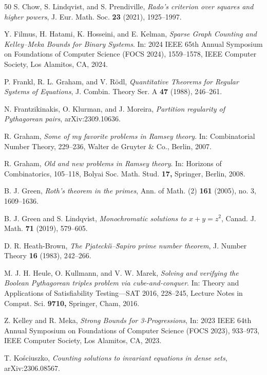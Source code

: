 \documentclass[12pt, reqno]{amsart}
\theoremstyle{definition}
\theoremstyle{remark}
\numberwithin{equation}{section}
\theoremstyle{definition}
\begin{document}
\begin{thebibliography}{50}
S. Chow, S. Lindqvist, and S. Prendiville, \emph{Rado's criterion over squares and higher powers}, J. Eur. Math. Soc. \textbf{23} (2021), 1925--1997.

Y. Filmus, H. Hatami, K. Hosseini, and E. Kelman, \emph{Sparse Graph Counting and Kelley--Meka Bounds for Binary Systems}. In: 2024 IEEE 65th Annual Symposium on Foundations of Computer Science (FOCS 2024), 1559--1578, IEEE Computer Society, Los Alamitos, CA, 2024.

P. Frankl, R. L. Graham, and V. R\"odl, \emph{Quantitative Theorems for Regular
Systems of Equations},
J. Combin. Theory Ser. A \textbf{47} (1988), 246--261.

N. Frantzikinakis, O. Klurman, and J. Moreira, \emph{Partition regularity of Pythagorean pairs}, 	arXiv:2309.10636.

R. Graham, \emph{Some of my favorite problems in Ramsey theory}. In: Combinatorial Number Theory, 229--236, Walter de Gruyter \& Co., Berlin, 2007.

R. Graham, \emph{Old and new problems in Ramsey theory}. In: Horizons of Combinatorics, 105--118, Bolyai Soc. Math. Stud. \textbf{17,} Springer, Berlin, 2008.

B. J. Green, \emph{Roth's theorem in the primes}, Ann. of Math. (2) \textbf{161} (2005), no. 3, 1609--1636.

B. J. Green and S. Lindqvist, \emph{Monochromatic solutions to $x + y = z^2$}, Canad. J. Math. \textbf{71} (2019), 579--605.

D. R. Heath-Brown, \emph{The Pjatecki\u{\i}--\u{S}apiro prime number theorem}, J. Number Theory \textbf{16} (1983), 242--266.

M. J. H. Heule, O. Kullmann, and V. W. Marek, \emph{Solving and verifying the Boolean Pythagorean
triples problem via cube-and-conquer}. In: Theory and Applications of Satisfiability
Testing---SAT 2016, 228--245, Lecture Notes in Comput. Sci. \textbf{9710,}
Springer, Cham, 2016.

Z. Kelley and R. Meka, \emph{Strong Bounds for 3-Progressions}, In: 2023 IEEE 64th Annual Symposium on Foundations of Computer Science (FOCS 2023), 933--973, IEEE Computer Society, Los Alamitos, CA, 2023. %

T. Ko\'sciuszko, \emph{Counting solutions to invariant equations in dense sets}, 	arXiv:2306.08567.


\end{thebibliography}
\end{document}
